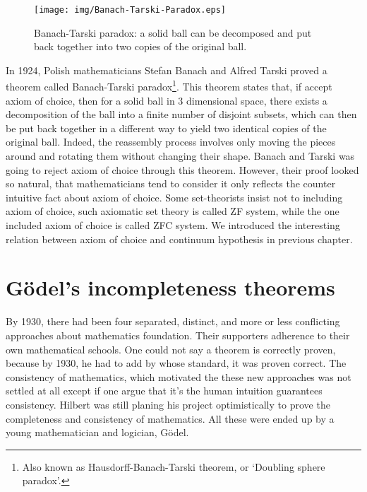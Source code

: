 \documentclass{article}
\begin{document}
\begin{figure}[htbp]
 \centering
 \texttt{[image: img/Banach-Tarski-Paradox.eps]}
 \caption{Banach-Tarski paradox: a solid ball can be decomposed and put back together into two copies of the original ball.}
 \label{fig:Banach-Tarski-Paradox}
\end{figure}

 
In 1924, Polish mathematicians Stefan Banach and Alfred Tarski proved a theorem called Banach-Tarski paradox\footnote{Also known as Hausdorff-Banach-Tarski theorem, or `Doubling sphere paradox'.}. This theorem states that, if accept axiom of choice, then for a solid ball in 3 dimensional space, there exists a decomposition of the ball into a finite number of disjoint subsets, which can then be put back together in a different way to yield two identical copies of the original ball. Indeed, the reassembly process involves only moving the pieces around and rotating them without changing their shape. Banach and Tarski was going to reject axiom of choice through this theorem. However, their proof looked so natural, that mathematicians tend to consider it only reflects the counter intuitive fact about axiom of choice. Some set-theorists insist not to including axiom of choice, such axiomatic set theory is called ZF system, while the one included axiom of choice is called ZFC system. We introduced the interesting relation between axiom of choice and continuum hypothesis in previous chapter.

\section{Gödel's incompleteness theorems}

By 1930, there had been four separated, distinct, and more or less conflicting approaches about mathematics foundation. Their supporters adherence to their own mathematical schools. One could not say a theorem is correctly proven, because by 1930, he had to add by whose standard, it was proven correct. The consistency of mathematics, which motivated the these new approaches was not settled at all except if one argue that it's the human intuition guarantees consistency\cite{M-Kline-2007}. Hilbert was still planing his project optimistically to prove the completeness and consistency of mathematics. All these were ended up by a young mathematician and logician, Gödel.
\end{document}
